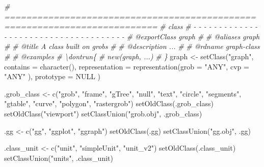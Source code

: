 \documentclass[
]{article}
\newenvironment{Shaded}{\begin{snugshade}}{\end{snugshade}}
\newcommand{\AttributeTok}[1]{\textcolor[rgb]{0.77,0.63,0.00}{#1}}
\newcommand{\CommentTok}[1]{\textcolor[rgb]{0.56,0.35,0.01}{\textit{#1}}}
\newcommand{\ConstantTok}[1]{\textcolor[rgb]{0.00,0.00,0.00}{#1}}
\newcommand{\FunctionTok}[1]{\textcolor[rgb]{0.00,0.00,0.00}{#1}}
\newcommand{\NormalTok}[1]{#1}
\newcommand{\OtherTok}[1]{\textcolor[rgb]{0.56,0.35,0.01}{#1}}
\newcommand{\StringTok}[1]{\textcolor[rgb]{0.31,0.60,0.02}{#1}}
\begin{document}
\begin{Shaded}
\begin{Highlighting}[]
\CommentTok{\# ==========================================================================}
\CommentTok{\# class}
\CommentTok{\# {-} {-} {-} {-} {-} {-} {-} {-} {-} {-} {-} {-} {-} {-} {-} {-} {-} {-} {-} {-} {-} {-} {-} {-} {-} {-} {-} {-} {-} {-} {-} {-} {-} {-} {-} {-} {-}}
\CommentTok{\#\textquotesingle{} @exportClass graph}
\CommentTok{\#\textquotesingle{}}
\CommentTok{\#\textquotesingle{} @aliases graph}
\CommentTok{\#\textquotesingle{}}
\CommentTok{\#\textquotesingle{} @title A class built on \textquotesingle{}grobs\textquotesingle{}}
\CommentTok{\#\textquotesingle{}}
\CommentTok{\#\textquotesingle{} @description ...}
\CommentTok{\#\textquotesingle{}}
\CommentTok{\#\textquotesingle{} @rdname graph{-}class}
\CommentTok{\#\textquotesingle{}}
\CommentTok{\#\textquotesingle{} @examples}
\CommentTok{\#\textquotesingle{} \textbackslash{}dontrun\{}
\CommentTok{\#\textquotesingle{} new(\textquotesingle{}graph\textquotesingle{}, ...)}
\CommentTok{\#\textquotesingle{} \}}
\NormalTok{graph }\OtherTok{\textless{}{-}} 
  \FunctionTok{setClass}\NormalTok{(}\StringTok{"graph"}\NormalTok{, }
    \AttributeTok{contains =} \FunctionTok{character}\NormalTok{(),}
    \AttributeTok{representation =} 
      \FunctionTok{representation}\NormalTok{(}\AttributeTok{grob =} \StringTok{"ANY"}\NormalTok{,}
        \AttributeTok{cvp =} \StringTok{"ANY"}
\NormalTok{        ),}
      \AttributeTok{prototype =} \ConstantTok{NULL}
\NormalTok{  )}

\NormalTok{.grob\_class }\OtherTok{\textless{}{-}} \FunctionTok{c}\NormalTok{(}\StringTok{"grob"}\NormalTok{, }\StringTok{"frame"}\NormalTok{, }\StringTok{"gTree"}\NormalTok{, }\StringTok{"null"}\NormalTok{,}
  \StringTok{"text"}\NormalTok{, }\StringTok{"circle"}\NormalTok{, }\StringTok{"segments"}\NormalTok{, }\StringTok{"gtable"}\NormalTok{,}
  \StringTok{"curve"}\NormalTok{, }\StringTok{"polygon"}\NormalTok{, }\StringTok{"rastergrob"}\NormalTok{)}
\FunctionTok{setOldClass}\NormalTok{(.grob\_class)}
\FunctionTok{setOldClass}\NormalTok{(}\StringTok{"viewport"}\NormalTok{)}
\FunctionTok{setClassUnion}\NormalTok{(}\StringTok{"grob.obj"}\NormalTok{, .grob\_class)}

\NormalTok{.gg }\OtherTok{\textless{}{-}} \FunctionTok{c}\NormalTok{(}\StringTok{"gg"}\NormalTok{, }\StringTok{"ggplot"}\NormalTok{, }\StringTok{"ggraph"}\NormalTok{)}
\FunctionTok{setOldClass}\NormalTok{(.gg)}
\FunctionTok{setClassUnion}\NormalTok{(}\StringTok{"gg.obj"}\NormalTok{, .gg)}

\NormalTok{.class\_unit }\OtherTok{\textless{}{-}} \FunctionTok{c}\NormalTok{(}\StringTok{"unit"}\NormalTok{, }\StringTok{"simpleUnit"}\NormalTok{, }\StringTok{"unit\_v2"}\NormalTok{)}
\FunctionTok{setOldClass}\NormalTok{(.class\_unit)}
\FunctionTok{setClassUnion}\NormalTok{(}\StringTok{"units"}\NormalTok{, .class\_unit)}
\end{Highlighting}
\end{Shaded}
\end{document}
